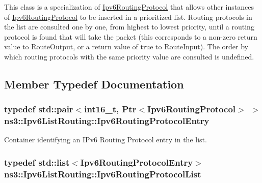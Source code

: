 This class is a specialization of \hyperlink{classns3_1_1Ipv6RoutingProtocol}{Ipv6\+Routing\+Protocol} that allows other instances of \hyperlink{classns3_1_1Ipv6RoutingProtocol}{Ipv6\+Routing\+Protocol} to be inserted in a prioritized list. Routing protocols in the list are consulted one by one, from highest to lowest priority, until a routing protocol is found that will take the packet (this corresponds to a non-\/zero return value to Route\+Output, or a return value of true to Route\+Input). The order by which routing protocols with the same priority value are consulted is undefined. 

\subsection{Member Typedef Documentation}
\subsubsection[{\texorpdfstring{Ipv6\+Routing\+Protocol\+Entry}{Ipv6RoutingProtocolEntry}}]{\setlength{\rightskip}{0pt plus 5cm}typedef std\+::pair$<$int16\+\_\+t, {\bf Ptr}$<${\bf Ipv6\+Routing\+Protocol}$>$ $>$ {\bf ns3\+::\+Ipv6\+List\+Routing\+::\+Ipv6\+Routing\+Protocol\+Entry}\hspace{0.3cm}{\ttfamily [private]}}\hypertarget{classns3_1_1Ipv6ListRouting_a319efc7e5387bd5e2ca63ffe82daa15d}{}\label{classns3_1_1Ipv6ListRouting_a319efc7e5387bd5e2ca63ffe82daa15d}


Container identifying an I\+Pv6 Routing Protocol entry in the list. 

\subsubsection[{\texorpdfstring{Ipv6\+Routing\+Protocol\+List}{Ipv6RoutingProtocolList}}]{\setlength{\rightskip}{0pt plus 5cm}typedef {\bf std\+::list}$<${\bf Ipv6\+Routing\+Protocol\+Entry}$>$ {\bf ns3\+::\+Ipv6\+List\+Routing\+::\+Ipv6\+Routing\+Protocol\+List}\hspace{0.3cm}{\ttfamily [private]}}\hypertarget{classns3_1_1Ipv6ListRouting_ac06678936e0664598621368bbfa8f6de}{}\label{classns3_1_1Ipv6ListRouting_ac06678936e0664598621368bbfa8f6de}


